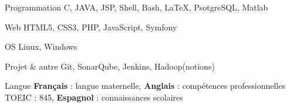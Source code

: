 

\begin{cvskills}

	\cvskill
		{Programmation} %
		{C, JAVA, JSP, Shell, Bash, \LaTeX, PsotgreSQL, Matlab} %

	\cvskill
		{Web} %
		{HTML5, CSS3, PHP, JavaScript, Symfony} %

	\cvskill
		{OS} %
		{Linux, Windows} %

	\cvskill
	    {Projet \& autre} %
	    {Git, SonarQube, Jenkins, Hadoop(notions)} %

  \cvskill
    {Langue} %
    {\textbf{Français} : langue maternelle, \textbf{Anglais}  : compétences professionnelles TOEIC : 845, \textbf{Espagnol} : connaissances scolaires} %

\end{cvskills}
